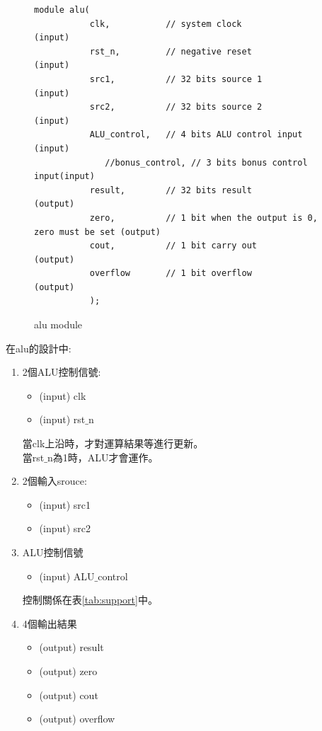 \documentclass[12pt,a4paper]{article}
\theoremstyle{definition}
\begin{document}
\begin{figure}[H]
\centering
\begin{lstlisting}[caption={}]
module alu(
           clk,           // system clock              (input)
           rst_n,         // negative reset            (input)
           src1,          // 32 bits source 1          (input)
           src2,          // 32 bits source 2          (input)
           ALU_control,   // 4 bits ALU control input  (input)
			  //bonus_control, // 3 bits bonus control input(input) 
           result,        // 32 bits result            (output)
           zero,          // 1 bit when the output is 0, zero must be set (output)
           cout,          // 1 bit carry out           (output)
           overflow       // 1 bit overflow            (output)
           );
\end{lstlisting}
\caption{alu module}
\label{fig:alu_}
\end{figure}

在alu的設計中:
\begin{enumerate}
\item 2個ALU控制信號:
\begin{itemize}
\item (input) clk
\item (input) rst$\_$n
\end{itemize}
當clk上沿時，才對運算結果等進行更新。\\
當rst$\_$n為1時，ALU才會運作。

\item 2個輸入srouce:
\begin{itemize}
\item (input) src1
\item (input) src2
\end{itemize}

\item ALU控制信號
\begin{itemize}
\item (input) ALU$\_$control
\end{itemize}
控制關係在表\ref{tab:support}中。

\item 4個輸出結果
\begin{itemize}
\item (output) result
\item (output) zero
\item (output) cout
\item (output) overflow
\end{itemize}
\end{enumerate}
\end{document}
